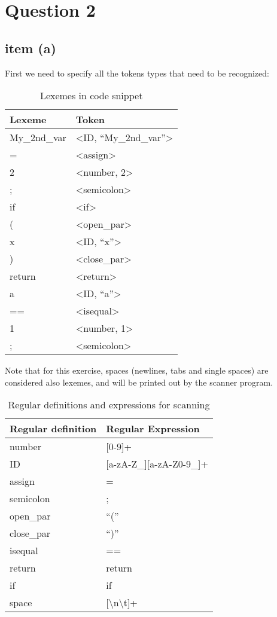 \documentclass[10pt]{article}
\begin{document}
\pagebreak

\section*{Question 2}

\subsection*{item (a)}

First we need to specify all the tokens types that need to be recognized:

\begin{table}[H]
\centering
\begin{tabular}{p{4cm} l}
\bfseries Lexeme & \bfseries Token \\
\hline
My\_2nd\_var     & <ID, ``My\_2nd\_var''> \\
=                & <assign> \\
2                & <number, 2> \\
;                & <semicolon> \\
if               & <if>        \\
(                & <open\_par> \\
x                & <ID, ``x''> \\
)                & <close\_par> \\
return           & <return>  \\
a                & <ID, ``a''> \\
==               & <isequal>  \\
1                & <number, 1> \\
;                & <semicolon> \\
\hline
\end{tabular}
\caption{Lexemes in code snippet}
\end{table}

Note that for this exercise, spaces (newlines, tabs and single spaces) are considered also lexemes, and will be printed out by the scanner program.

\begin{table}[H]
\centering
\begin{tabular}{p{4cm} l}
\bfseries Regular definition & \bfseries Regular Expression\\
\hline
number     &   [0-9]+ \\
ID         &   [a-zA-Z\_][a-zA-Z0-9\_]+ \\
assign     &   = \\
semicolon  &   ; \\
open\_par  &   ``('' \\
close\_par &   ``)'' \\
isequal    &   == \\
return     &   return \\
if         &   if \\
space      &   [\textbackslash n\textbackslash t\textvisiblespace]+ \\
\hline
\end{tabular}
\caption{Regular definitions and expressions for scanning}
\end{table}
\end{document}

